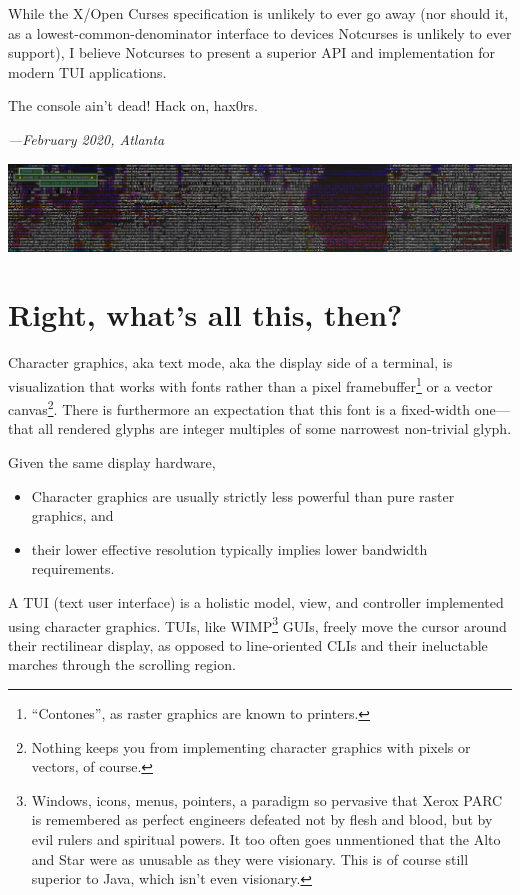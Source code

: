 \documentclass[letterpaper,10pt]{article}
\newenvironment{denseitemize}{
  \begin{itemize}
      \setlength{\itemsep}{0pt}
}{
  \end{itemize}
}
\begin{document}
While the X/Open Curses specification is unlikely to ever go away (nor should
it, as a lowest-common-denominator interface to devices Notcurses is unlikely
to ever support), I believe Notcurses to present a superior API and
implementation for modern TUI applications.

The console ain't dead! Hack on, hax0rs.

\vspace{.5in}

\begin{flushright}
  \textit{---February 2020, Atlanta}
\end{flushright}

\vfill

\begin{center}
\includegraphics[width=1\linewidth]{media/widechars.png}
\end{center}

\newpage
\section{Right, what's all this, then?}
Character graphics, aka text mode, aka the display side of a terminal, is
visualization that works with fonts rather than a pixel framebuffer\footnote{``Contones'', as raster graphics are known to printers.}
or a vector canvas\footnote{Nothing keeps you from implementing character graphics
with pixels or vectors, of course.}. There is furthermore an expectation that
this font is a fixed-width one---that all rendered glyphs are integer multiples
of some narrowest non-trivial glyph.

Given the same display hardware,

\begin{denseitemize}
\item{Character graphics are usually strictly less powerful than pure raster graphics, and}
\item{their lower effective resolution typically implies lower bandwidth requirements.}
\end{denseitemize}

A TUI (text user interface) is a holistic model, view, and controller implemented
using character graphics. TUIs, like WIMP\footnote{Windows, icons, menus, pointers, a paradigm so pervasive that
 Xerox PARC is remembered as perfect engineers defeated not by flesh and blood,
but by evil rulers and spiritual powers. It too often goes unmentioned that the
Alto and Star were as unusable as they were visionary\cite{lightningdealers}.
This is of course still superior to Java, which isn't even visionary.} GUIs,
freely move the cursor around their rectilinear display, as opposed to
line-oriented CLIs and their ineluctable marches through the scrolling region.
\end{document}
